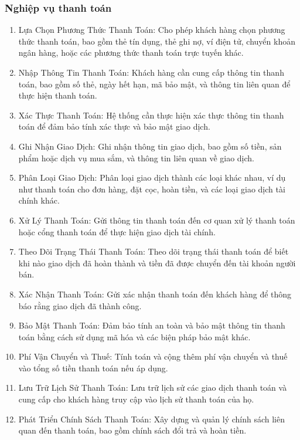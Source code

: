         \subsubsection{Nghiệp vụ thanh toán}
        \begin{enumerate}
            \item Lựa Chọn Phương Thức Thanh Toán:
        Cho phép khách hàng chọn phương thức thanh toán, bao gồm thẻ tín dụng, thẻ ghi nợ, ví điện tử, chuyển khoản ngân hàng, hoặc các phương thức thanh toán trực tuyến khác.
            \item Nhập Thông Tin Thanh Toán:
        Khách hàng cần cung cấp thông tin thanh toán, bao gồm số thẻ, ngày hết hạn, mã bảo mật, và thông tin liên quan để thực hiện thanh toán.
            \item Xác Thực Thanh Toán:
        Hệ thống cần thực hiện xác thực thông tin thanh toán để đảm bảo tính xác thực và bảo mật giao dịch.
            \item Ghi Nhận Giao Dịch:
        Ghi nhận thông tin giao dịch, bao gồm số tiền, sản phẩm hoặc dịch vụ mua sắm, và thông tin liên quan về giao dịch.
            \item Phân Loại Giao Dịch:
        Phân loại giao dịch thành các loại khác nhau, ví dụ như thanh toán cho đơn hàng, đặt cọc, hoàn tiền, và các loại giao dịch tài chính khác.
            \item Xử Lý Thanh Toán:
        Gửi thông tin thanh toán đến cơ quan xử lý thanh toán hoặc cổng thanh toán để thực hiện giao dịch tài chính.
            \item Theo Dõi Trạng Thái Thanh Toán:
        Theo dõi trạng thái thanh toán để biết khi nào giao dịch đã hoàn thành và tiền đã được chuyển đến tài khoản người bán.
            \item Xác Nhận Thanh Toán:
        Gửi xác nhận thanh toán đến khách hàng để thông báo rằng giao dịch đã thành công.
            \item Bảo Mật Thanh Toán:
        Đảm bảo tính an toàn và bảo mật thông tin thanh toán bằng cách sử dụng mã hóa và các biện pháp bảo mật khác.
            \item Phí Vận Chuyển và Thuế:
        Tính toán và cộng thêm phí vận chuyển và thuế vào tổng số tiền thanh toán nếu áp dụng.
            \item Lưu Trữ Lịch Sử Thanh Toán:
        Lưu trữ lịch sử các giao dịch thanh toán và cung cấp cho khách hàng truy cập vào lịch sử thanh toán của họ.
            \item Phát Triển Chính Sách Thanh Toán:
        Xây dựng và quản lý chính sách liên quan đến thanh toán, bao gồm chính sách đổi trả và hoàn tiền.
        \end{enumerate}
   